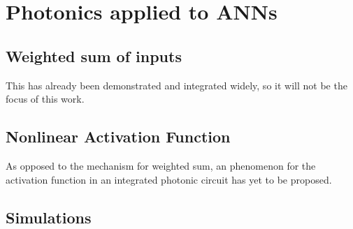 \section{Photonics applied to ANNs}
\label{sec:Photonics_applied_to_ANNs}

\subsection{Weighted sum of inputs}
\label{ssec:Weighted_Sum_of_inputs}
This has already been demonstrated and integrated widely, so it will not be the focus of this work.

\subsection{Nonlinear Activation Function}
\label{ssec:Nonlinear_Activation_Function}
As opposed to the mechanism for weighted sum, an phenomenon for the activation function in an integrated photonic circuit has yet to be proposed.

\subsection{Simulations}